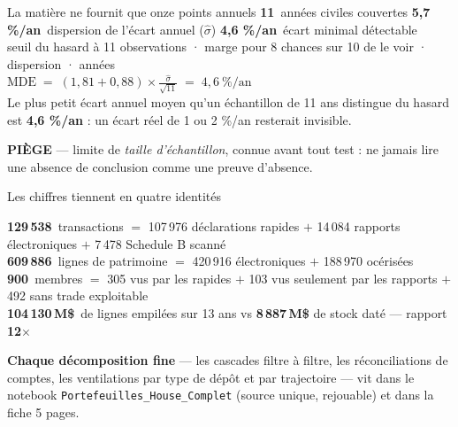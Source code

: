 \documentclass[11pt,aspectratio=169]{beamer}
\newcommand{\co}[1]{\texttt{#1}}
\newcommand{\kpi}[3]{{\large\textbf{\textcolor{#1}{#2}}}~{\footnotesize #3}}
\newcommand{\piege}[1]{%
  \colorbox{warnorange!12}{\parbox{\dimexpr\linewidth-8pt}{\scriptsize
    \textbf{\textcolor{warnorange}{PIÈGE}}\; --- #1}}}
\newcommand{\bmaths}[2]{%
  {\scriptsize\color{black!55}#1}\\[0.2mm]
  {\small$\displaystyle #2$}\\[2mm]}
\begin{document}
\begin{frame}{La matière ne fournit que onze points annuels}
  \centering
  \vspace{2mm}
  \kpi{helec}{11}{années civiles couvertes}\quad
  \kpi{dataC}{5,7 \%/an}{dispersion de l'écart annuel ($\hat\sigma$)}\quad
  \kpi{alertred}{4,6 \%/an}{écart minimal détectable}\\[4mm]
  \bmaths{seuil du hasard à 11 observations · marge pour 8 chances sur 10 de le voir · dispersion · années}
         {\mathrm{MDE} \;=\; (1{,}81 + 0{,}88)\times \frac{\hat\sigma}{\sqrt{11}} \;=\; 4{,}6\ \%/\text{an}}
  {\footnotesize Le plus petit écart annuel moyen qu'un échantillon de 11 ans distingue du hasard
  est \textbf{4,6 \%/an} : un écart réel de 1 ou 2 \%/an resterait invisible.}\\[3mm]
  \piege{limite de \emph{taille d'échantillon}, connue avant tout test : ne jamais lire une absence
  de conclusion comme une preuve d'absence.}
\end{frame}


\begin{frame}{Les chiffres tiennent en quatre identités}
  \vspace{2mm}
  \begin{center}\begin{minipage}{0.92\textwidth}\footnotesize
  \kpi{okgreen}{129\,538}{transactions} $=$ 107\,976 déclarations rapides $+$ 14\,084 rapports
    électroniques $+$ 7\,478 Schedule B scanné\\[3.2mm]
  \kpi{dataC}{609\,886}{lignes de patrimoine} $=$ 420\,916 électroniques $+$ 188\,970 océrisées\\[3.2mm]
  \kpi{helec}{900}{membres} $=$ 305 vus par les rapides $+$ 103 vus seulement par les rapports
    $+$ 492 sans trade exploitable\\[3.2mm]
  \kpi{alertred}{104\,130\,M\$}{de lignes empilées sur 13 ans} \; vs \; \textbf{8\,887\,M\$}
    de stock daté --- rapport \textbf{12$\times$}
  \end{minipage}\end{center}
  \vspace{5mm}
  \begin{center}\colorbox{black!5}{\parbox{0.90\textwidth}{\centering\footnotesize\vspace{1mm}
  \textbf{Chaque décomposition fine} --- les cascades filtre à filtre, les réconciliations de
  comptes, les ventilations par type de dépôt et par trajectoire --- vit dans le notebook
  \co{Portefeuilles\_House\_Complet} (source unique, rejouable) et dans la fiche 5 pages.
  \vspace{1mm}}}\end{center}
\end{frame}
\end{document}
